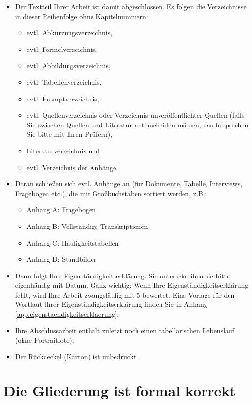 \begin{itemize}[label={--}]
\item Der Textteil Ihrer Arbeit ist damit abgeschlossen. Es folgen die Verzeichnisse in dieser Reihenfolge ohne Kapitelnummern:
  \begin{itemize}[label={$\bullet$}]
  \item evtl. Abkürzungsverzeichnis,
  \item evtl. Formelverzeichnis,
  \item evtl. Abbildungsverzeichnis,
  \item evtl. Tabellenverzeichnis,
  \item evtl. Promptverzeichnis,
  \item evtl. Quellenverzeichnis oder Verzeichnis unveröffentlichter Quellen (falls Sie zwischen Quellen und Literatur unterscheiden müssen, das besprechen Sie bitte mit Ihren Prüfern),
  \item Literaturverzeichnis und
  \item evtl. Verzeichnis der Anhänge.
  \end{itemize}

\item Daran schließen sich evtl. Anhänge an (für Dokumente, Tabelle, Interviews, Fragebögen etc.), die mit Großbuchstaben sortiert werden, z.B.:
  \begin{itemize}[leftmargin=*,label={}]
  \item Anhang A: Fragebogen
  \item Anhang B: Vollständige Transkriptionen
  \item Anhang C: Häufigkeitstabellen
  \item Anhang D: Standbilder
  \end{itemize}

\item Dann folgt Ihre Eigenständigkeitserklärung. Sie unterschreiben sie bitte eigenhändig mit Datum. Ganz wichtig: Wenn Ihre Eigenständigkeitserklärung fehlt, wird Ihre Arbeit zwangsläufig mit 5 bewertet. Eine Vorlage für den Wortlaut Ihrer Eigenständigkeitserklärung finden Sie in Anhang \ref{app:eigenstaendigkeitserklaerung}.
\item Ihre Abschlussarbeit enthält zuletzt noch einen tabellarischen Lebenslauf (ohne Portraitfoto).
\item Der Rückdeckel (Karton) ist unbedruckt.
\end{itemize}

\section{Die Gliederung ist formal korrekt}
\label{sec:gliederung-formal-korrekt}

